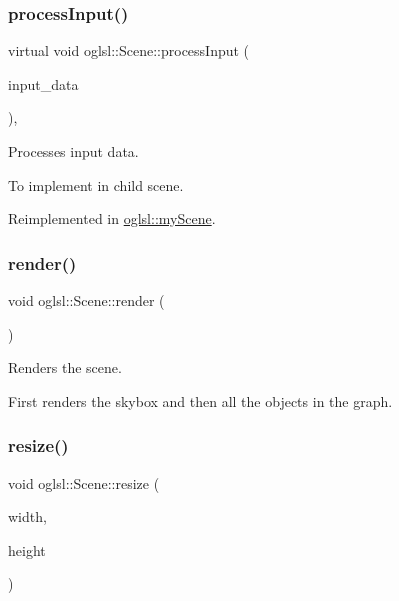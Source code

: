 \subsubsection{\texorpdfstring{process\+Input()}{processInput()}}
{\footnotesize\ttfamily virtual void oglsl\+::\+Scene\+::process\+Input (\begin{DoxyParamCaption}\item[{\mbox{\hyperlink{classoglsl_1_1_input_a3b21d7328538e661f366af5d6059c197}{Input\+::\+Input\+Data}}}]{input\+\_\+data }\end{DoxyParamCaption})\hspace{0.3cm}{\ttfamily [inline]}, {\ttfamily [virtual]}}



Processes input data. 

To implement in child scene. 

Reimplemented in \mbox{\hyperlink{classoglsl_1_1my_scene_aeab1e8cfe8c40f6110e1789a74008191}{oglsl\+::my\+Scene}}.

\mbox{\label{classoglsl_1_1_scene_a94b552369f7653c854d38a1553c84288}} 
\subsubsection{\texorpdfstring{render()}{render()}}
{\footnotesize\ttfamily void oglsl\+::\+Scene\+::render (\begin{DoxyParamCaption}{ }\end{DoxyParamCaption})\hspace{0.3cm}{\ttfamily [inline]}}



Renders the scene. 

First renders the skybox and then all the objects in the graph. \mbox{\label{classoglsl_1_1_scene_a1eac687cef62ac021bfdd98749aa2ee5}} 
\subsubsection{\texorpdfstring{resize()}{resize()}}
{\footnotesize\ttfamily void oglsl\+::\+Scene\+::resize (\begin{DoxyParamCaption}\item[{int}]{width,  }\item[{int}]{height }\end{DoxyParamCaption})\hspace{0.3cm}{\ttfamily [inline]}}



